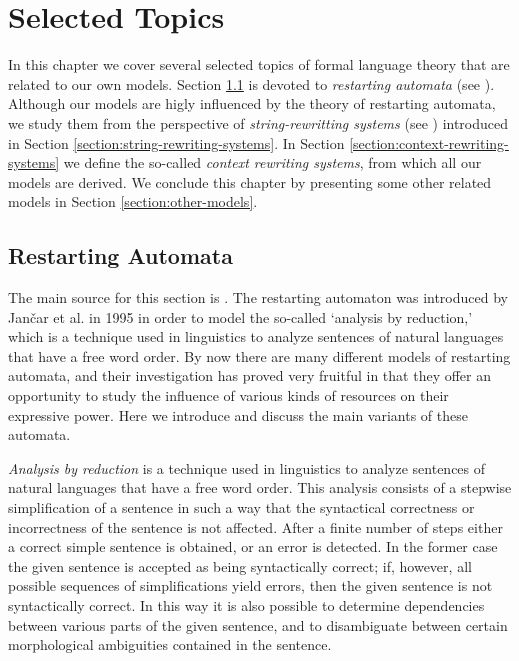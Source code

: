 \chapter{Selected Topics}
\label{chapter:advanced}

In this chapter we cover several selected topics of formal language theory that are related to our own models. Section \ref{section:restarting-automata} is devoted to \emph{restarting automata} (see \cite{O06}). Although our models are higly influenced by the theory of restarting automata, we study them from the perspective of \emph{string-rewritting systems} (see \cite{bookOtto93}) introduced in Section \ref{section:string-rewriting-systems}. In Section \ref{section:context-rewriting-systems} we define the so-called \emph{context rewriting systems}, from which all our models are derived. We conclude this chapter by presenting some other related models in Section \ref{section:other-models}.

\section{Restarting Automata}
\label{section:restarting-automata}

The main source for this section is \cite{O06}. The restarting automaton was introduced by Jančar et al. in 1995 in order to model the so-called `analysis by reduction,' which is a technique used in linguistics to analyze sentences of natural languages that have a free word order. By now there are many different models of restarting automata, and their investigation has proved very fruitful in that they offer an opportunity to study the influence of various kinds of resources on their expressive power. Here we introduce and discuss the main variants of these automata.

\emph{Analysis by reduction} is a technique used in linguistics to analyze sentences of natural languages that have a free word order. This analysis consists of a stepwise simplification of a sentence in such a way that the syntactical correctness or incorrectness of the sentence is not affected. After a finite number of steps either a correct simple sentence is obtained, or an error is detected. In the former case the given sentence is accepted as being syntactically correct; if, however, all possible sequences of simplifications yield errors, then the given sentence is not syntactically correct. In this way it is also possible to determine dependencies between various parts of the given sentence, and to disambiguate between certain morphological ambiguities contained in the sentence.


